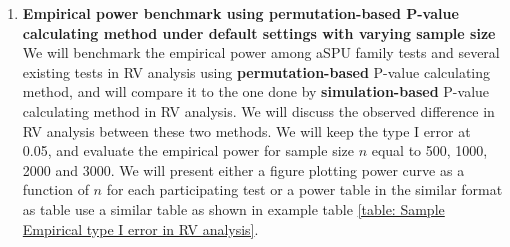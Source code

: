 \documentclass[12pt]{article}
\begin{document}
\begin{enumerate}
\item \textbf{Empirical power benchmark using permutation-based P-value calculating method under default settings with varying sample size}\\
We will benchmark the empirical power among aSPU family tests and several existing tests in RV analysis using \textbf{permutation-based} P-value calculating method, and will compare it to the one done by \textbf{simulation-based} P-value calculating method in RV analysis. We will discuss the observed difference in RV analysis between these two methods. We will keep the type I error at 0.05, and evaluate the empirical power for sample size $n$ equal to 500, 1000, 2000 and 3000. We will present either a figure plotting power curve as a function of $n$ for each participating test or a power table in the similar format as table use a similar table as shown in example table \ref{table: Sample Empirical type I error in RV analysis}.


\end{enumerate}
\end{document}
